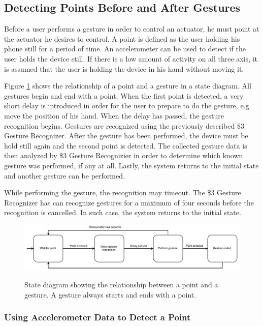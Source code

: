 \subsection{Detecting Points Before and After Gestures}

Before a user performs a gesture in order to control an actuator, he must point at the actuator he desires to control. A point is defined as the user holding his phone still for a period of time. An accelerometer can be used to detect if the user holds the device still. If there is a low amount of activity on all three axis, it is assumed that the user is holding the device in his hand without moving it.

Figure \ref{fig:gesture-recognition:point-to-gesture-state-diagram} shows the relationship of a point and a gesture in a state diagram. All gestures begin and end with a point. When the first point is detected, a very short delay is introduced in order for the user to prepare to do the gesture, e.g. move the position of his hand. When the delay has passed, the gesture recognition begins. Gestures are recognized using the previously described \$3 Gesture Recognizer. After the gesture has been performed, the device must be hold still again and the second point is detected. The collected gesture data is then analyzed by \$3 Gesture Recognizier in order to determine which known gesture was performed, if any at all. Lastly, the system returns to the initial state and another gesture can be performed.

While performing the gesture, the recognition may timeout. The \$3 Gesture Recognizer has can recognize gestures for a maximum of four seconds before the recognition is cancelled. In such case, the system returns to the initial state.

\begin{figure}[h]
\centering
\includegraphics[width=\textwidth]{images/point-to-gesture-state-diagram}
\label{fig:gesture-recognition:point-to-gesture-state-diagram}
\caption{State diagram showing the relationship between a point and a gesture. A gesture always starts and ends with a point.}
\end{figure}

\subsubsection{Using Accelerometer Data to Detect a Point}

